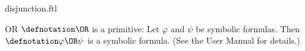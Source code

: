 \documentclass{stex}
\begin{document}
\begin{smodule}{disjunction.ftl}


\begin{documentation}{OR}
  $\defnotation\OR$ is a \Naproche primitive:
  Let $\varphi$ and $\psi$ be symbolic formulas.
  Then $\defnotation\varphi\OR\psi$ is a symbolic formula.
  (See the \Naproche User Manual for details.)
\end{documentation}

\end{smodule}
\end{document}
